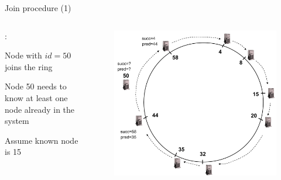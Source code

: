\begin{frame}{Join procedure (1)}

\begin{columns}
\begin{column}{0.4\textwidth}
:
\BI
\item Node with $\mathit{id}=50$ joins the ring
\item Node 50 needs to know at least one node already in the system
\item Assume known node is 15		
\EI

\end{column}
\begin{column}{0.6\textwidth}
\begin{figure}
\includegraphics[width=1.0\textwidth]{figs/10/chord-example3}
\end{figure}
\end{column}
\end{columns}

\end{frame}


